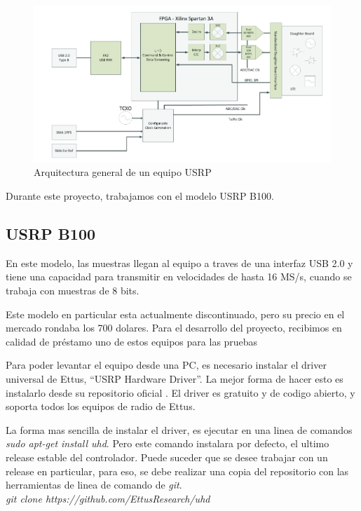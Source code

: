 \begin{figure}[h!]
	\centering
	\includegraphics[scale=0.55]{figuras/cap04/usrp_arq}
	\caption{\label{f:usrp_arq} Arquitectura general de un equipo USRP}
\end{figure}

Durante este proyecto, trabajamos con el modelo USRP B100.

\subsection{USRP B100}

En este modelo, las muestras llegan al equipo a traves de una interfaz USB 2.0 y tiene una capacidad para transmitir en velocidades de hasta 16 MS/s, cuando se trabaja con muestras de 8 bits. 

Este modelo en particular esta actualmente discontinuado, pero su precio en el mercado rondaba los 700 dolares. Para el desarrollo del proyecto, recibimos en calidad de préstamo uno de estos equipos para las pruebas

Para poder levantar el equipo desde una PC, es necesario instalar el driver universal de Ettus, “USRP Hardware Driver”. La mejor forma de hacer esto es instalarlo desde su repositorio oficial \cite{UHD}. El driver es gratuito y de codigo abierto, y soporta todos los equipos de radio de Ettus.

La forma mas sencilla de instalar el driver, es ejecutar en una linea de comandos \textit{sudo apt-get install uhd}. Pero este comando instalara por defecto, el ultimo release estable del controlador. Puede suceder que se desee trabajar con un release en particular, para eso, se debe realizar una copia del repositorio con las herramientas de linea de comando de \textit{git}.\\

\textit{git clone https://github.com/EttusResearch/uhd}\\

